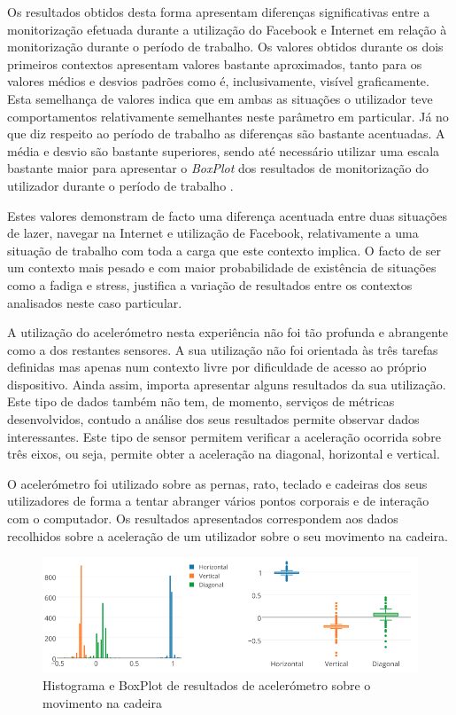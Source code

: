 Os resultados obtidos desta forma apresentam diferenças significativas entre a monitorização efetuada durante a utilização do Facebook e Internet em relação à monitorização durante o período de trabalho. Os valores obtidos durante os dois primeiros contextos apresentam valores bastante aproximados, tanto para os valores médios e desvios padrões como é, inclusivamente, visível graficamente. Esta semelhança de valores indica que em ambas as situações o utilizador teve comportamentos relativamente semelhantes neste parâmetro em particular. Já no que diz respeito ao período de trabalho as diferenças são bastante acentuadas. A média e desvio são bastante superiores, sendo até necessário utilizar uma escala bastante maior para apresentar o \textit{BoxPlot} dos resultados de monitorização do utilizador durante o período de trabalho . 


Estes valores demonstram de facto uma diferença acentuada entre duas situações de lazer, navegar na Internet e utilização de Facebook, relativamente a uma situação de trabalho com toda a carga que este contexto implica. O facto de ser um contexto mais pesado e com maior probabilidade de existência de situações como a fadiga e stress, justifica a variação de resultados entre os contextos analisados neste caso particular.

A utilização do acelerómetro nesta experiência não foi tão profunda e abrangente como a dos restantes sensores. A sua utilização não foi orientada às três tarefas definidas mas apenas num contexto livre por dificuldade de acesso ao próprio dispositivo. Ainda assim, importa apresentar alguns resultados da sua utilização. Este tipo de dados também não tem, de momento, serviços de métricas desenvolvidos, contudo a análise dos seus resultados permite observar dados interessantes. Este tipo de sensor permitem verificar a aceleração ocorrida sobre três eixos, ou seja, permite obter a aceleração na diagonal, horizontal e vertical.

O acelerómetro foi utilizado sobre as pernas, rato, teclado e cadeiras dos seus utilizadores de forma a tentar abranger vários pontos corporais e de interação com o computador. Os resultados apresentados correspondem aos dados recolhidos sobre a aceleração de um utilizador sobre o seu movimento na cadeira. 

 \begin{figure}[htb]
   \centering
   \includegraphics[scale=0.45]{Images/acceleration.png}
   \caption{Histograma e BoxPlot de resultados de acelerómetro sobre o movimento na cadeira}
\end{figure}

